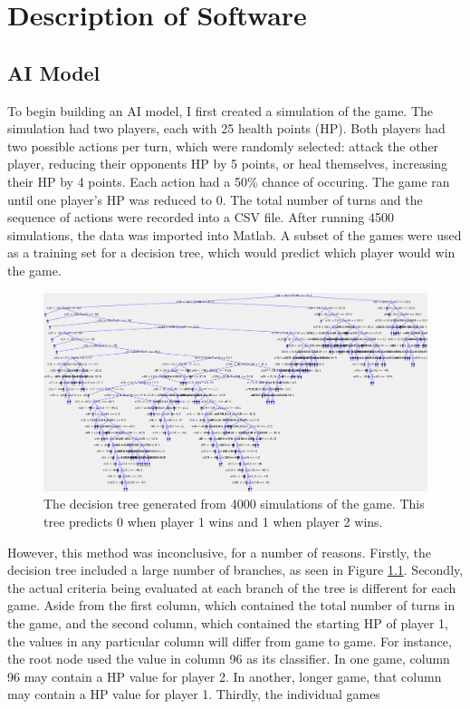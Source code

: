 \chapter{Description of Software}
\section{AI Model}
To begin building an AI model, I first created a simulation of the game. The simulation had two players, each with 25 health points (HP). Both players had two possible actions per turn, which were randomly selected: attack the other player, reducing their opponents HP by 5 points, or heal themselves, increasing their HP by 4 points. Each action had a 50\% chance of occuring. The game ran until one player's HP was reduced to 0. The total number of turns and the sequence of actions were recorded into a CSV file. After running 4500 simulations, the data was imported into Matlab. A subset of the games were used as a training set for a decision tree, which would predict which player would win the game.\\

\begin{figure}[H]
  \centering
  \includegraphics[width=12cm]{figures/firstDecisionTree.png}
  \caption{The decision tree generated from 4000 simulations of the game. This tree predicts 0 when player 1 wins and 1 when player 2 wins.}
  \label{fig:decisionTree1}
\end{figure}

However, this method was inconclusive, for a number of reasons. Firstly, the decision tree included a large number of branches, as seen in Figure \ref{fig:decisionTree1}. Secondly, the actual criteria being evaluated at each branch of the tree is different for each game. Aside from the first column, which contained the total number of turns in the game, and the second column, which contained the starting HP of player 1, the values in any particular column will differ from game to game. For instance, the root node used the value in column 96 as its classifier. In one game, column 96 may contain a HP value for player 2. In another, longer game, that column may contain a HP value for player 1. Thirdly, the individual games 
